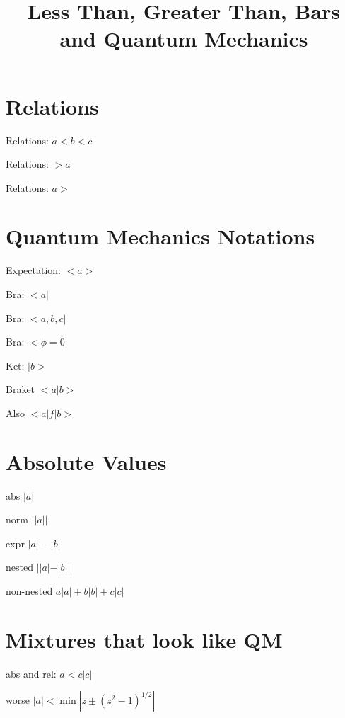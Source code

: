 \documentclass{article}
\title{Less Than, Greater Than, Bars and Quantum Mechanics}
\begin{document}
\section{Relations}
Relations: $ a < b < c $

Relations: $ > a $

Relations: $ a > $

\section{Quantum Mechanics Notations}
Expectation: $ <a> $

Bra: $<a|$

Bra: $<a,b,c|$

Bra: $<\phi=0|$

Ket: $|b>$

Braket $<a|b>$

Also $<a|f|b>$

\section{Absolute Values}
abs $|a|$

norm $||a||$

expr $|a|-|b|$

nested $||a|-|b||$

non-nested $a|a|+b|b|+c|c|$

\section{Mixtures that look like QM}

abs and rel: $a<c|c|$

worse $|a|< \min\left|z\pm\left(z^{2}-1\right)^{{1/2}}\right|$
\end{document}
